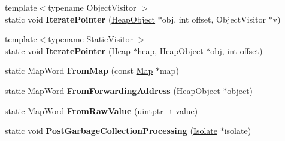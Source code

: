 \begin{DoxyCompactItemize}
\item 
{\footnotesize template$<$typename Object\+Visitor $>$ }\\static void {\bfseries Iterate\+Pointer} (\hyperlink{classv8_1_1internal_1_1_heap_object}{Heap\+Object} $\ast$obj, int offset, Object\+Visitor $\ast$v)\hypertarget{classv8_1_1internal_1_1_b_a_s_e___e_m_b_e_d_d_e_d_a1cac77b6686ee8fc3e01d691673b640b}{}\label{classv8_1_1internal_1_1_b_a_s_e___e_m_b_e_d_d_e_d_a1cac77b6686ee8fc3e01d691673b640b}

\item 
{\footnotesize template$<$typename Static\+Visitor $>$ }\\static void {\bfseries Iterate\+Pointer} (\hyperlink{classv8_1_1internal_1_1_heap}{Heap} $\ast$heap, \hyperlink{classv8_1_1internal_1_1_heap_object}{Heap\+Object} $\ast$obj, int offset)\hypertarget{classv8_1_1internal_1_1_b_a_s_e___e_m_b_e_d_d_e_d_afe9b70a2e235a573be0d087dbb259698}{}\label{classv8_1_1internal_1_1_b_a_s_e___e_m_b_e_d_d_e_d_afe9b70a2e235a573be0d087dbb259698}

\item 
static Map\+Word {\bfseries From\+Map} (const \hyperlink{classv8_1_1internal_1_1_map}{Map} $\ast$map)\hypertarget{classv8_1_1internal_1_1_b_a_s_e___e_m_b_e_d_d_e_d_a38fdd3dc4b0966e4e79a3b612f8a5f67}{}\label{classv8_1_1internal_1_1_b_a_s_e___e_m_b_e_d_d_e_d_a38fdd3dc4b0966e4e79a3b612f8a5f67}

\item 
static Map\+Word {\bfseries From\+Forwarding\+Address} (\hyperlink{classv8_1_1internal_1_1_heap_object}{Heap\+Object} $\ast$object)\hypertarget{classv8_1_1internal_1_1_b_a_s_e___e_m_b_e_d_d_e_d_abe0c0ec4a4471c0230116e18e0632c31}{}\label{classv8_1_1internal_1_1_b_a_s_e___e_m_b_e_d_d_e_d_abe0c0ec4a4471c0230116e18e0632c31}

\item 
static Map\+Word {\bfseries From\+Raw\+Value} (uintptr\+\_\+t value)\hypertarget{classv8_1_1internal_1_1_b_a_s_e___e_m_b_e_d_d_e_d_a98c9610bbfba30de96ae3120b3b1844a}{}\label{classv8_1_1internal_1_1_b_a_s_e___e_m_b_e_d_d_e_d_a98c9610bbfba30de96ae3120b3b1844a}

\item 
static void {\bfseries Post\+Garbage\+Collection\+Processing} (\hyperlink{classv8_1_1internal_1_1_isolate}{Isolate} $\ast$isolate)\hypertarget{classv8_1_1internal_1_1_b_a_s_e___e_m_b_e_d_d_e_d_a810ae8977975a1daf5c9df7be2fc35fa}{}\label{classv8_1_1internal_1_1_b_a_s_e___e_m_b_e_d_d_e_d_a810ae8977975a1daf5c9df7be2fc35fa}


\end{DoxyCompactItemize}
